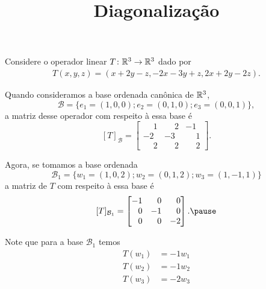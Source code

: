 \documentclass{beamer}
\title{Diagonalização}
\author[\autor]{\autor}
\institute[\instituto]{\instituto}
\date{}
\begin{document}
    \begin{frame}
        \maketitle
    \end{frame}


    \begin{frame}
        Considere o operador linear $T \colon \mathbb{R}^3 \to \mathbb{R}^3$ dado por
        \begin{align*}
            T(x, y, z) = (x + 2y - z, -2x -3y + z, 2x + 2y - 2z).
        \end{align*}

        Quando consideramos a base ordenada canônica \pause de $\mathbb{R}^3$, \pause
        \[
            \mathcal{B} = \{e_1 = (1, 0, 0); e_2 = (0, 1, 0); e_3 = (0, 0, 1)\},
        \]
        a matriz desse operador com respeito à essa base é\pause
        \[
            [T]_\mathcal{B} = \begin{bmatrix}
                \phantom{-}1 & \phantom{-}2 & -1\\
                -2 & -3 & \phantom{-}1\\
                \phantom{-}2 & \phantom{-}2 & \phantom{-}2
            \end{bmatrix}.
        \]\pause
    \end{frame}

    \begin{frame}
        Agora, se tomamos a base ordenada \pause
        \[
            \mathcal{B}_1 = \{w_1 = (1, 0, 2); w_2 = (0, 1, 2); w_3 = (1, -1, 1)\}
        \]\pause
        a matriz de $T$ com respeito à essa base é\pause
        \[
            [T]_{\mathcal{B}_1} = \begin{bmatrix}
            -1 & \phantom{-}0 & \phantom{-}0\\
            \phantom{-}0& -1 & \phantom{-}0\\
            \phantom{-}0& \phantom{-}0 & -2
        \end{bmatrix}.\pause
        \]

        Note que para a base $\mathcal{B}_1$ temos \pause
        \begin{align*}
            T(w_1) &= -1w_1\\
            T(w_2) &= -1w_2\\
            T(w_3) &= -2w_3\\
        \end{align*}
    \end{frame}
\end{document}
